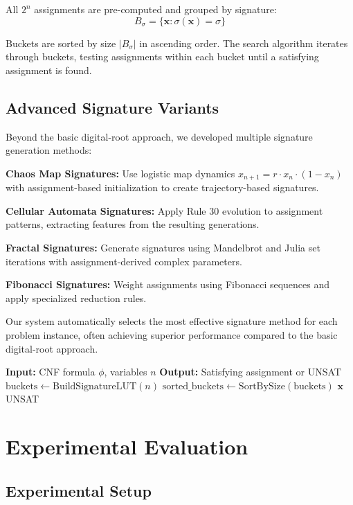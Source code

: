 \documentclass[conference]{IEEEtran}
\begin{document}
All $2^n$ assignments are pre-computed and grouped by signature:
$$B_\sigma = \{\mathbf{x} : \sigma(\mathbf{x}) = \sigma\}$$

Buckets are sorted by size $|B_\sigma|$ in ascending order. The search algorithm iterates through buckets, testing assignments within each bucket until a satisfying assignment is found.

\subsection{Advanced Signature Variants}

Beyond the basic digital-root approach, we developed multiple signature generation methods:

\textbf{Chaos Map Signatures:} Use logistic map dynamics $x_{n+1} = r \cdot x_n \cdot (1-x_n)$ with assignment-based initialization to create trajectory-based signatures.

\textbf{Cellular Automata Signatures:} Apply Rule 30 evolution to assignment patterns, extracting features from the resulting generations.

\textbf{Fractal Signatures:} Generate signatures using Mandelbrot and Julia set iterations with assignment-derived complex parameters.

\textbf{Fibonacci Signatures:} Weight assignments using Fibonacci sequences and apply specialized reduction rules.

Our system automatically selects the most effective signature method for each problem instance, often achieving superior performance compared to the basic digital-root approach.

\begin{algorithmic}
\STATE \textbf{Input:} CNF formula $\phi$, variables $n$
\STATE \textbf{Output:} Satisfying assignment or UNSAT
\STATE
\STATE $\text{buckets} \leftarrow \text{BuildSignatureLUT}(n)$
\STATE $\text{sorted\_buckets} \leftarrow \text{SortBySize}(\text{buckets})$
\STATE
{}
            \RETURN $\mathbf{x}$
        \ENDIF
    \ENDFOR
\ENDFOR
\RETURN UNSAT
\end{algorithmic}

\section{Experimental Evaluation}

\subsection{Experimental Setup}
\end{document}
